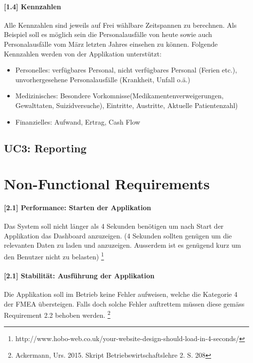 \documentclass[a4paper]{scrreprt}
\begin{document}
\paragraph{[1.4] Kennzahlen}
Alle Kennzahlen sind jeweils auf Frei wählbare Zeitspannen zu berechnen. Als Beispiel soll es möglich sein die Personalausfälle von heute sowie auch Personalausfälle vom März letzten Jahres einsehen zu können. Folgende Kennzahlen werden von der Applikation unterstützt:
\begin{itemize}
\item Personelles: verfügbares Personal, nicht verfügbares Personal (Ferien etc.), unvorhergesehene Personalausfälle (Krankheit, Unfall o.ä.)\\
\item Medizinisches: Besondere Vorkomnisse(Medikamentenverweigerungen, Gewalttaten, Suizidversuche), Eintritte, Austritte, Aktuelle Patientenzahl) \\
\item Finanzielles: Aufwand, Ertrag, Cash Flow\\
\end{itemize}
\subsection{UC3: Reporting}

\section{Non-Functional Requirements}
\paragraph{[2.1] Performance: Starten der Applikation}
Das System soll nicht länger als 4 Sekunden benötigen um nach Start der Applikation das Dashboard anzuzeigen. (4 Sekunden sollten genügen um die relevanten Daten zu laden und anzuzeigen. Ausserdem ist es genügend kurz um den Benutzer nicht zu belasten)
\footnote{http://www.hobo-web.co.uk/your-website-design-should-load-in-4-seconds/}

\paragraph{[2.1] Stabilität: Ausführung der Applikation}
Die Applikation soll im Betrieb keine Fehler aufweisen, welche die Kategorie 4 der FMEA übersteigen. Falls doch solche Fehler auftrettem müssen diese gemäss Requirement 2.2 behoben werden. 
\footnote{Ackermann, Urs. 2015. Skript Betriebswirtschaftslehre 2. S. 208}
\end{document}
